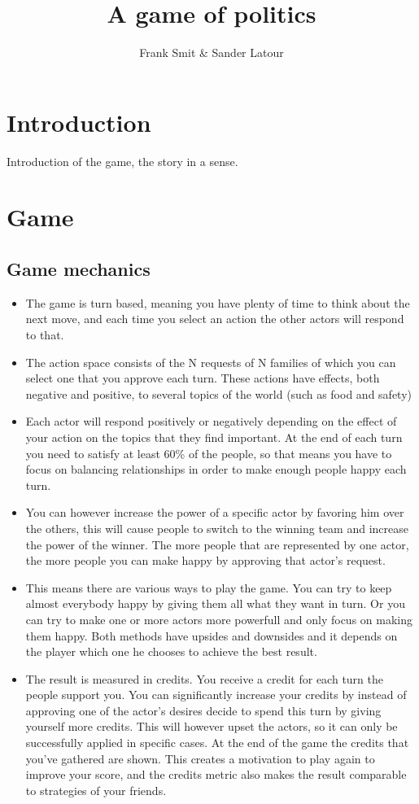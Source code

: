 \documentclass[11pt,a4paper]{article}
\author{Frank Smit \& Sander Latour}
\title{A game of politics}
\begin{document}
\maketitle

\section{Introduction}
Introduction of the game, the story in a sense.
\section{Game}
\subsection{Game mechanics}
  \begin{itemize}
    \item The game is turn based, meaning you have plenty of time to think about the next move, and each time you select an action the other actors will respond to that.
    \item The action space consists of the N requests of N families of which you can select one that you approve each turn. These actions have effects, both negative and positive, to several topics of the world (such as food and safety)
    \item Each actor will respond positively or negatively depending on the effect of your action on the topics that they find important. At the end of each turn you need to satisfy at least 60\% of the people, so that means you have to focus on balancing relationships in order to make enough people happy each turn.
    \item You can however increase the power of a specific actor by favoring him over the others, this will cause people to switch to the winning team and increase the power of the winner. The more people that are represented by one actor, the more people you can make happy by approving that actor's request.
    \item This means there are various ways to play the game. You can try to keep almost everybody happy by giving them all what they want in turn. Or you can try to make one or more actors more powerfull and only focus on making them happy. Both methods have upsides and downsides and it depends on the player which one he chooses to achieve the best result.
    \item The result is measured in credits. You receive a credit for each turn the people support you. You can significantly increase your credits by instead of approving one of the actor's desires decide to spend this turn by giving yourself more credits. This will however upset the actors, so it can only be successfully applied in specific cases. At the end of the game the credits that you've gathered are shown. This creates a motivation to play again to improve your score, and the credits metric also makes the result comparable to strategies of your friends.
  \end{itemize}
\end{document}
